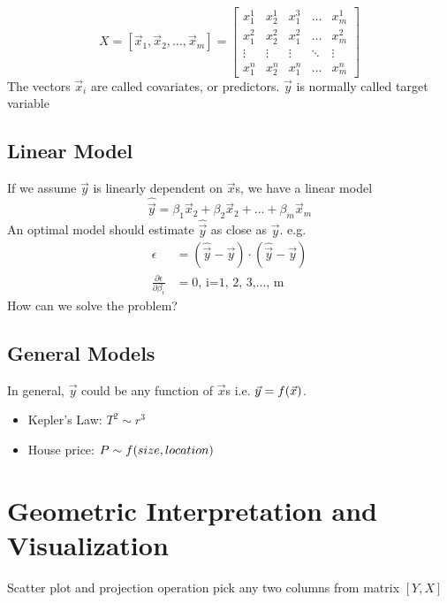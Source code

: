 \documentclass[12pt, oneside]{article}
\begin{document}
\[X=
[\vec{x}_1,\vec{x}_2, \hdots, \vec{x}_m]=
\begin{bmatrix}
    x_1^1 & x_2^1  & x_1^3  & \dots  & x_m^1 \\
    x_1^2 & x_2^2  & x_1^2  & \dots  & x_m^2\\
    \vdots& \vdots & \vdots & \ddots & \vdots \\
  	x_1^n & x_2^n  & x_1^n  & \dots  & x_m^n
\end{bmatrix}
\]
The vectors $\vec{x}_i$ are called covariates, or predictors. 
$\vec{y}$ is normally called  target variable 

\subsection{Linear Model}
If we assume $\vec{y}$ is linearly dependent on $\vec{x}$s, we have a linear model
$${\hat{\vec{y}}}=\beta_1\vec{x}_2+\beta_2\vec{x}_2+ \dots +\beta_m\vec{x}_m$$
An optimal model should estimate $\hat{\vec{y}}$ as close as $\vec{y}$. e.g.
\begin{align*}
\epsilon&=(\hat{\vec{y}}-\vec{y})\cdot(\hat{\vec{y}}-\vec{y})\\
\frac{\partial{\epsilon}}{\partial \beta_i}&=0 \text{, i=1, 2, 3,..., m}
\end{align*}
How can we solve the problem?


\subsection{General Models}
In general, $\vec{y}$ could be any function of $\vec{x}$s i.e. $\vec{y}=\mathnormal{f}({\vec{x}})$.

\begin{itemize}
\item Kepler's Law: $T^2 \sim r^3$
\item House price: $P \sim \mathnormal{f}(size, location)$
\end{itemize}

\section{Geometric Interpretation and Visualization}
Scatter plot and projection operation
pick any two columns from matrix $[Y, X]$
\end{document}
